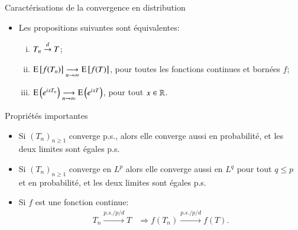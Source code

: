     \begin{frame}
        [allowframebreaks]{Caractérisations de la convergence en distribution}
        \begin{itemize}
            \item Les propositions suivantes sont équivalentes:\begin{enumerate}[(i)]
                \item $T_n\overset{d}{\rightarrow} T$;
                \medskip
                \item $\operatorname{E}\left[f(T_n)\right] 
                \underset{n\rightarrow \infty}{\longrightarrow}\operatorname{E}\left[f(T)\right]$, 
                pour toutes les fonctions continues et bornées $f$;
                \medskip
                \item $\operatorname{E}\left(e^{ixT_n}\right)
                \underset{n\rightarrow \infty}{\longrightarrow} \operatorname{E}\left(e^{ixT}\right)$, 
                pour tout $x\in\mathbb{R}$.
            \end{enumerate}
        \end{itemize}
    \end{frame}
        \begin{frame}
            [allowframebreaks]{Propriétés importantes}\begin{itemize}
                \item Si $(T_n)_{n\geq 1}$ converge p.s., alors elle converge 
                aussi en probabilité, et les deux limites sont égales p.s.
                \item Si $(T_n)_{n\geq 1}$ converge en $L^p$ alors elle converge aussi en $L^q$ pour tout $q\leq p$ 
                et en probabilité, et les deux limites sont égales p.s.
                \item Si $f$ est une fonction continue: \begin{align*}
                    T_n\overset{p.s./p/d}{\longrightarrow} T &\Rightarrow 
                    f(T_n) \overset{p.s./p/d}{\longrightarrow} f(T).
                \end{align*}
            \end{itemize}
        \end{frame}

